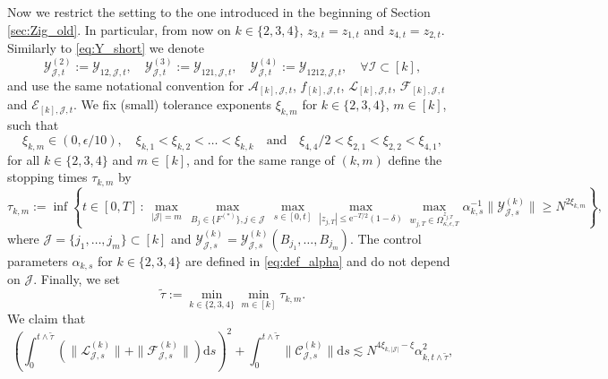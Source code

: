 \documentclass[10pt]{amsart}
\numberwithin{equation}{section}
\newcommand{\dif}{\mathrm{d}}
\newcommand{\ee}{\mathrm{e}}
\begin{document}
Now we restrict the setting to the one introduced in the beginning of Section \ref{sec:Zig_old}. In particular, from now on $k\in \{2,3,4\}$, $z_{3,t}=z_{1,t}$ and $z_{4,t}=z_{2,t}$. Similarly to \eqref{eq:Y_short} we denote
\begin{equation}
\mathcal{Y}^{(2)}_{\mathcal{J},t}:=\mathcal{Y}_{12,\mathcal{J},t},\quad \mathcal{Y}^{(3)}_{\mathcal{J},t}:=\mathcal{Y}_{121,\mathcal{J},t},\quad \mathcal{Y}^{(4)}_{\mathcal{J},t}:=\mathcal{Y}_{1212,\mathcal{J},t}, \quad \forall \mathcal{I}\subset [k],
\end{equation}
and use the same notational convention for $\mathcal{A}_{[k], \mathcal{J},t}$, $f_{[k],\mathcal{J},t}$, $\mathcal{L}_{[k],\mathcal{J},t}$, $\mathcal{F}_{[k],\mathcal{J},t}$ and $\mathcal{E}_{[k],\mathcal{J},t}$. We fix (small) tolerance exponents $\xi_{k,m}$ for $k\in \{2,3,4\}$, $m\in [k]$, such that
\begin{equation}
\xi_{k,m}\in (0,\epsilon/10),\quad \xi_{k,1}< \xi_{k,2}<\ldots< \xi_{k,k} \quad\text{and}\quad \xi_{4,4}/2< \xi_{2,1}< \xi_{2,2} < \xi_{4,1},
\label{eq:xi_new}
\end{equation}
for all $k\in \{2,3,4\}$ and $m\in [k]$, and for the same range of $(k,m)$ define the stopping times $\tau_{k,m}$ by
\begin{equation}
\tau_{k,m}\!:= \inf\left\lbrace \!t\!\in\! [0,T]\,:\, \max_{|\mathcal{J}|=m}\,\max_{B_j\in \{F^{(*)}\},j\in\mathcal{J}}\,\max_{s\in [0,t]}\max_{|z_{j,T}|\le \ee^{-T/2}(1-\delta)}\max_{w_{j,T}\in\Omega_{\kappa,\epsilon,T}^{z_{j,T}}} \alpha_{k,s}^{-1}\|\mathcal{Y}^{(k)}_{\mathcal{J},s}\|\ge N^{2\xi_{k,m}}\!\right\rbrace\!,
\label{eq:def_tau_k_new}
\end{equation}
where $\mathcal{J}=\{j_1,\ldots,j_m\}\subset [k]$ and $\mathcal{Y}^{(k)}_{\mathcal{J},s} = \mathcal{Y}^{(k)}_{\mathcal{J},s}(B_{j_1},\ldots,B_{j_m})$. The control parameters $\alpha_{k,s}$ for $k\in \{2,3,4\}$ are defined in \eqref{eq:def_alpha} and do not depend on $\mathcal{J}$. Finally, we set
\begin{equation}
\widetilde{\tau}:=\min_{k\in \{2,3,4\}}\min_{m\in [k]} \tau_{k,m}.
\end{equation}
We claim that
\begin{equation}
\left(\int_0^{t\wedge\widetilde{\tau}}\left(\|\mathcal{L}_{\mathcal{J},s}^{(k)}\| + \|\mathcal{F}_{\mathcal{J},s}^{(k)}\|\right)\dif s\right)^2 +\int_0^{t\wedge\widetilde{\tau}} \|\mathcal{C}^{(k)}_{\mathcal{J},s}\|\dif s \lesssim  N^{4\xi_{k,|\mathcal{J}|}-\xi}\alpha_{k,t\wedge\widetilde{\tau}}^2,
\label{eq:err_bounds_new}
\end{equation}
\end{document}
